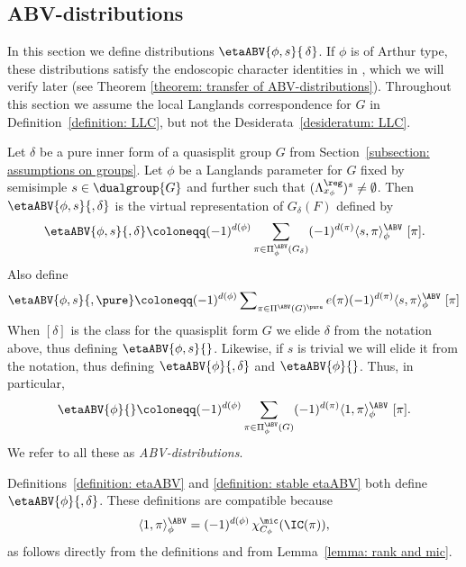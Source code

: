 \documentclass[11pt,letterpaper]{amsart}
\numberwithin{equation}{section}
\begin{document}
\subsection{ABV-distributions}\label{subsection: ABV-distributions}

In this section we define distributions $\etaABV{\phi,s}{\,\delta}$. If $\phi$ is of Arthur type, these distributions satisfy the endoscopic character identities in \cite{Art13}, which we will verify later (see Theorem \ref{theorem: transfer of ABV-distributions}).
Throughout this section we assume the local Langlands correspondence for $G$ in Definition~\ref{definition: LLC}, but not the Desiderata~\ref{desideratum: LLC}.

\begin{definition}\label{definition: etaABV}
Let $\delta$ be a pure inner form of a quasisplit group $G$ from Section~\ref{subsection: assumptions on groups}.
Let $\phi$ be a Langlands parameter for $G$ fixed by semisimple $s\in \dualgroup{G}$ and further such that $(\Lambda^\reg_{x_\phi})^s\neq \emptyset$.
Then
     $\etaABV{\phi,s}{,\delta}$ is the virtual representation of $G_{\delta}(F)$ defined by
    \[        
    \etaABV{\phi,s}{,\delta}
    \coloneqq
    (-1)^{d(\phi)}
        \sum_{\pi \in \Pi^\ABV_{\phi}(G_\delta)} (-1)^{d(\pi)} 
        \langle {s}, \pi\rangle_{\phi}^{\ABV} \ 
        [\pi].
\]
Also define
\[  
    \etaABV{\phi,s}{,\pure}
    \coloneqq
       (-1)^{d(\phi)} \operatorname{\sum}\limits_{\pi \in \Pi^\ABV(G)^\pure} e(\pi) (-1)^{d(\pi)} 
     \langle {s}, \pi\rangle_{\phi}^{\ABV} \ 
       [\pi] 
    \]
When $[\delta]$ is the class for the quasisplit form $G$ we elide $\delta$ from the notation above, thus defining $\etaABV{\phi,s}{}$.
Likewise, if $s$ is trivial we will elide it from the notation, thus defining $\etaABV{\phi}{,\delta}$ and $\etaABV{\phi}{}$.
Thus, in particular,
\[        
    \etaABV{\phi}{}
    \coloneqq
        (-1)^{d(\phi)}\sum_{\pi \in \Pi^\ABV_{\phi}(G)} (-1)^{d(\pi)} 
        \langle1, \pi\rangle_{\phi}^{\ABV} \ 
        [\pi].
\]
We refer to all these as {\it ABV-distributions}.
\end{definition}



\begin{remark}
Definitions~\ref{definition: etaABV} and \ref{definition: stable etaABV} both define $\etaABV{\phi}{,\delta}$. 
These definitions are compatible because
    \[
    \langle 1,\pi\rangle_\phi^\ABV
    =
    (-1)^{d(\phi)}\, \chi_{C_\phi}^\mic(\IC(\pi)),
    \]
as follows directly from the definitions and from Lemma~\ref{lemma: rank and mic}.
\end{remark}
\end{document}
